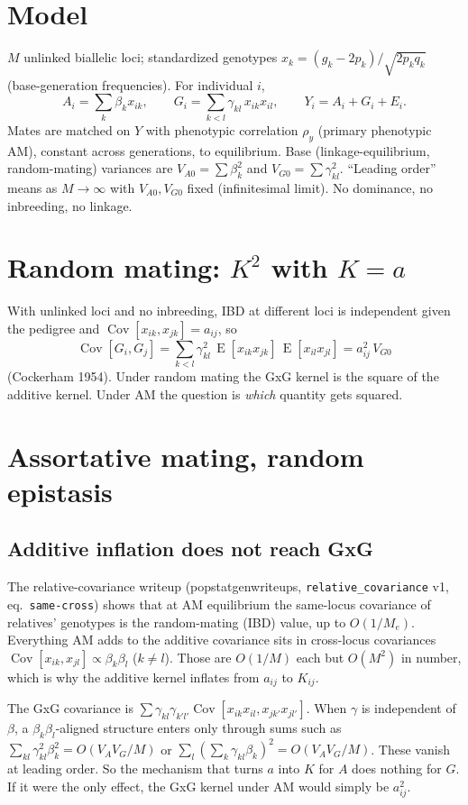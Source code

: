 \documentclass[11pt]{article}
\newcommand{\Cov}{\operatorname{Cov}}
\newcommand{\E}{\operatorname{E}}
\begin{document}
\section{Model}
$M$ unlinked biallelic loci; standardized genotypes $x_k=(g_k-2p_k)/\sqrt{2p_kq_k}$ (base-generation
frequencies). For individual $i$,
\[
A_i=\sum_k \beta_k x_{ik},\qquad
G_i=\sum_{k<l}\gamma_{kl}\,x_{ik}x_{il},\qquad
Y_i=A_i+G_i+E_i .
\]
Mates are matched on $Y$ with phenotypic correlation $\rho_y$ (primary phenotypic AM), constant across
generations, to equilibrium. Base (linkage-equilibrium, random-mating) variances are
$V_{A0}=\sum\beta_k^2$ and $V_{G0}=\sum\gamma_{kl}^2$. ``Leading order'' means as $M\to\infty$ with
$V_{A0},V_{G0}$ fixed (infinitesimal limit). No dominance, no inbreeding, no linkage.

\section{Random mating: \texorpdfstring{$K^2$}{K2} with \texorpdfstring{$K=a$}{K=a}}
With unlinked loci and no inbreeding, IBD at different loci is independent given the pedigree and
$\Cov[x_{ik},x_{jk}]=a_{ij}$, so
\[
\Cov[G_i,G_j]=\sum_{k<l}\gamma_{kl}^2\,\E[x_{ik}x_{jk}]\,\E[x_{il}x_{jl}]=a_{ij}^2\,V_{G0}
\]
(Cockerham 1954). Under random mating the GxG kernel is the square of the additive kernel. Under AM the
question is \emph{which} quantity gets squared.

\section{Assortative mating, random epistasis}
\subsection{Additive inflation does not reach GxG}
The relative-covariance writeup (popstatgenwriteups, \texttt{relative\_covariance} v1, eq.~\texttt{same-cross})
shows that at AM equilibrium the same-locus covariance of relatives' genotypes is the random-mating (IBD)
value, up to $O(1/M_e)$. Everything AM adds to the additive covariance sits in cross-locus covariances
$\Cov[x_{ik},x_{jl}]\propto\beta_k\beta_l$ ($k\neq l$). Those are $O(1/M)$ each but $O(M^2)$ in number,
which is why the additive kernel inflates from $a_{ij}$ to $K_{ij}$.

The GxG covariance is $\sum\gamma_{kl}\gamma_{k'l'}\Cov[x_{ik}x_{il},x_{jk'}x_{jl'}]$. When $\gamma$ is
independent of $\beta$, a $\beta_k\beta_l$-aligned structure enters only through sums such as
$\sum_{kl}\gamma_{kl}^2\beta_k^2=O(V_{A}V_{G}/M)$ or $\sum_l(\sum_k\gamma_{kl}\beta_k)^2=O(V_AV_G/M)$. These
vanish at leading order. So the mechanism that turns $a$ into $K$ for $A$ does nothing for $G$. If it were
the only effect, the GxG kernel under AM would simply be $a_{ij}^2$.
\end{document}
